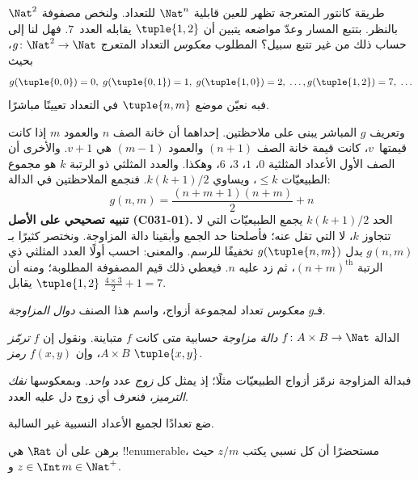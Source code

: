 \documentclass[../../../include/open-logic-section]{subfiles}
\begin{document}

\begin{explain}
طريقة كانتور المتعرجة تظهر للعين قابلية $\Nat^n$ للتعداد.
ولنخص مصفوفة $\Nat^2$ بالنظر. بتتبع المسار وعدّ مواضعه يتبين
أن $\tuple{1,2}$ يقابله العدد~$7$. فهل لنا إلى حساب ذلك من
غير تتبع سبيل؟ المطلوب \emph{معكوس} التعداد المتعرج
$g\colon \Nat^2 \to \Nat$، بحيث
\[
g(\tuple{0,0}) = 0, \;
g(\tuple{0,1}) = 1, \;
g(\tuple{1,0}) = 2, \; \dots,
g(\tuple{1,2}) = 7, \; \dots
\]
فبه نعيّن موضع $\tuple{n, m}$ في التعداد تعيينًا مباشرًا.

وتعريف $g$ المباشر يبنى على ملاحظتين. إحداهما أن خانة الصف $n$
والعمود $m$ إذا كانت قيمتها~$v$، كانت قيمة خانة الصف $(n+1)$
والعمود $(m-1)$ هي $v + 1$. والأخرى أن الصف الأول الأعداد
المثلثية $0$، $1$، $3$، $6$، وهكذا. والعدد المثلثي ذو الرتبة $k$
هو مجموع الطبيعيّات $\leq k$، ويساوي
$k(k+1)/2$. فنجمع الملاحظتين في الدالة:
\[
  g(n,m) = \frac{(n+m+1)(n+m)}{2} + n
\]
\textbf{تنبيه تصحيحي على الأصل (C031-01).} الحد $k(k+1)/2$ يجمع الطبيعيّات التي
لا تتجاوز $k$، لا التي تقل عنه؛ فأصلحنا حد الجمع وأبقينا دالة المزاوجة.
ونختصر كثيرًا بـ$g(n, m)$ بدل $g(\tuple{n, m})$ تخفيفًا للرسم.
والمعنى: احسب أولًا العدد المثلثي ذي الرتبة $(n+m)^\text{th}$،
ثم زد عليه $n$. فيعطي ذلك قيم المصفوفة المطلوبة؛ ومنه أن
$\tuple{1, 2}$ يقابل $\frac{4 \times 3}{2} +
1 = 7$.

فـ$g$ \emph{معكوس} تعداد لمجموعة أزواج، واسم هذا الصنف
\emph{دوال المزاوجة}.
\end{explain}

\begin{defn}
الدالة $f\colon A \times B \to \Nat$ \emph{دالة مزاوجة} حسابية
متى كانت $f$ متباينة. ونقول إن $f$ \emph{ترمّز} $A \times B$،
وإن $f(x,y)$ \emph{رمز} $\tuple{x,y}$.
\end{defn}

\begin{explain}
فبدالة المزاوجة نرمّز أزواج الطبيعيّات مثلًا؛ إذ يمثل كل
\emph{زوج} عدد \emph{واحد}. وبمعكوسها \emph{نفك الترميز}،
فنعرف أي زوج دل عليه العدد.
\end{explain}

\begin{prob}
ضع تعدادًا لجميع الأعداد النسبية غير السالبة.
\end{prob}

\begin{prob}
برهن على أن $\Rat$ هي !!{enumerable}، مستحضرًا أن كل نسبي
يكتب $z/m$ حيث $z \in \Int$ و$m \in \Nat^+$.
\end{prob}
\end{document}
